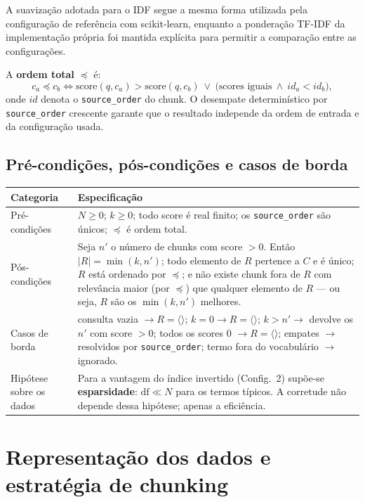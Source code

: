 \documentclass[11pt,a4paper]{article}
\begin{document}
A suavização adotada para o IDF segue a mesma forma utilizada pela configuração de referência com scikit-learn, enquanto a ponderação TF-IDF da implementação própria foi mantida explícita para permitir a comparação entre as configurações.

A \textbf{ordem total}
$\preceq$ é:
\[
c_a \preceq c_b \iff \mathrm{score}(q,c_a) > \mathrm{score}(q,c_b)\ \lor\
\big(\text{scores iguais}\ \wedge\ id_a < id_b\big),
\]
onde $id$ denota o \texttt{source\_order} do chunk. O desempate determinístico por \texttt{source\_order}
crescente garante que o resultado independe da ordem de entrada e da configuração usada.

\subsection{Pré-condições, pós-condições e casos de borda}
\begin{table}[h]
\small\centering
\begin{tabularx}{\textwidth}{@{}p{2.8cm}Y@{}}
\toprule
\textbf{Categoria} & \textbf{Especificação}\\
\midrule
Pré-condições & $N\ge0$; $k\ge0$; todo score é real finito; os \texttt{source\_order} são únicos; $\preceq$ é ordem total.\\
Pós-condições & Seja $n'$ o número de chunks com score $>0$. Então $|R|=\min(k,n')$; todo elemento de
$R$ pertence a $C$ e é único; $R$ está ordenado por $\preceq$; e não existe chunk fora de $R$ com
relevância maior (por $\preceq$) que qualquer elemento de $R$ --- ou seja, $R$ são os $\min(k,n')$ melhores.\\
Casos de borda & consulta vazia $\to R=\langle\rangle$; $k=0\to R=\langle\rangle$; $k>n'\to$ devolve
os $n'$ com score $>0$; todos os scores 0 $\to R=\langle\rangle$; empates $\to$ resolvidos por \texttt{source\_order};
termo fora do vocabulário $\to$ ignorado.\\
Hipótese sobre os dados & Para a vantagem do índice invertido (Config.~2) supõe-se \textbf{esparsidade}:
$\mathrm{df}\ll N$ para os termos típicos. A corretude não depende dessa hipótese; apenas a eficiência.\\
\bottomrule
\end{tabularx}
\end{table}

\section{Representação dos dados e estratégia de chunking}
\end{document}

